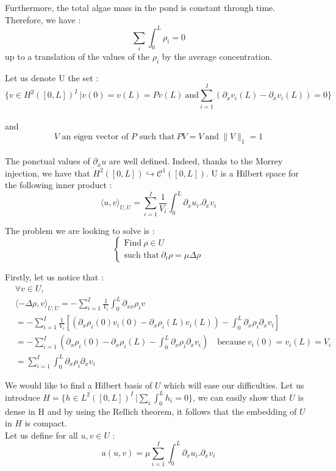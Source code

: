 \documentclass{article}
\begin{document}
Furthermore, the total algae mass in the pond is constant through time. Therefore, we have : \[\sum_i\int_0^L\rho_i = 0\] up to a translation of the values of the \(\rho_i\) by the average concentration.

Let us denote U the set : \[\{v \in H^2([0, L])^I \ | v(0) = v(L) = Pv(L) \ \text{and} \sum_{i=1}^I(\partial_xv_i(L) - \partial_xv_i(L)) = 0 \}\] \\ and
\[V \text{ an eigen vector of $P$ such that} \ PV = V \ \text{and} \ \|V\|_1 = 1\]
\\ The ponctual values of $\partial_xu$ are well defined. Indeed, thanks to the Morrey injection, we have that $H^2([0, L]) \hookrightarrow
\mathcal{C}^1([0, L])$. 
U is a Hilbert space for the following inner product :
\[\langle u, v\rangle_{U, U} = \sum_{i=1}^I\frac{1}{V_i}\int_{0}^{L}\partial_x u_i.\partial_x v_i\]

The problem we are looking to solve is :
\[\begin{cases}
    \text{Find}\  \rho \in U \\
    \text{such that} \ \partial_t\rho = \mu \Delta\rho 
\end{cases}\]

Firstly, let us notice that : 
\[
\begin{align}
    &\forall v\in U, \\
    &\langle-\Delta\rho, v\rangle_{U, U} = -\sum_{i=1}^I\frac{1}{V_i}\int_{0}^L\partial_{xx}\rho_iv \\
    &= -\sum_{i=1}^I\frac{1}{V_i}\left[\left(\partial_x\rho_i(0)v_i(0) - \partial_x\rho_i(L)v_i(L)\right) - \int_0^L\partial_x\rho_i\partial_xv_i\right]\\
    &= -\sum_{i=1}^I\left(\partial_x\rho_i(0) - \partial_x\rho_i(L) - \int_0^L\partial_x\rho_i\partial_xv_i\right) \quad  \text{because} \ v_i(0) = v_i(L) = V_i  \\
    & = \sum_{i=1}^I\int_0^L\partial_x\rho_i\partial_xv_i
\end{align}
\]

We would like to find a Hilbert basis of $U$ which will ease our difficulties. 
Let us introduce $H = \{h \in L^2([0, L])^I \ |  \sum_i\int_0^Lh_i = 0  \}$, we can easily show that $U$ is dense in H and by using the Rellich theorem, it follows that the embedding of $U$ in $H$ is compact. \\

Let us define for all $u, v \in U$ :
\[ a(u, v) = \mu\sum_{i=1}^I\int_{0}^{L}\partial_x u_i.\partial_x v_i \]
\end{document}
